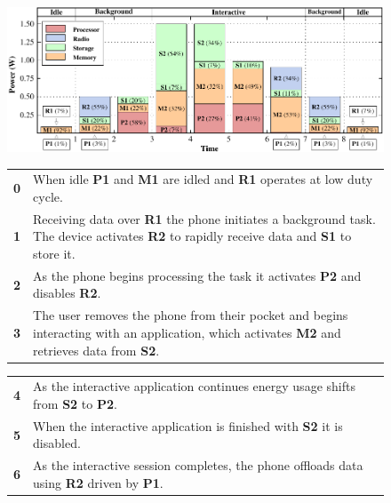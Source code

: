 \begin{figure}[t]
\includegraphics[width=\textwidth]{./figures/transitiongraph.pdf}
\noindent\begin{minipage}[t]{0.5\textwidth}
\vspace{-0.05in}
\begin{tabularx}{\columnwidth}{cX}

\textbf{0} & When idle \textbf{P1} and \textbf{M1} are idled and \textbf{R1}
operates at low duty cycle.
\\

\textbf{1} & Receiving data over \textbf{R1} the phone initiates a background
task. The device activates \textbf{R2} to rapidly receive data and
\textbf{S1} to store it.
\\

\textbf{2} &
As the phone begins processing the task it activates \textbf{P2} and disables
\textbf{R2}.
\\

\textbf{3} &
The user removes the phone from their pocket and begins interacting with an
application, which activates \textbf{M2} and retrieves data from \textbf{S2}.
\\

\end{tabularx}

\end{minipage}
\begin{minipage}[t]{0.5\textwidth}
\vspace{-0.05in}

\begin{tabularx}{\columnwidth}{cX}

\textbf{4} & As the interactive application continues energy usage shifts
from \textbf{S2} to \textbf{P2}.
\\

\textbf{5} & When the interactive application is finished with \textbf{S2} it
is disabled.
\\

\textbf{6} & As the interactive session completes, the phone offloads data
using \textbf{R2} driven by \textbf{P1}.
\\


\end{tabularx}
\end{minipage}
\end{figure}
